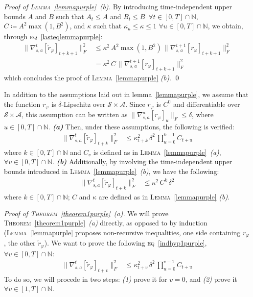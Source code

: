 \emph{Proof of \textsc{Lemma}~\ref{lemmapurple}~\emph{(b)}.}
By introducing time-independent upper bounds $A$ and $B$ such that
$A_t \leq A$ and $B_t \leq B$
$\, \forall t \in [0, T] \cap \mathbb{N}$,
$C \coloneqq A^2 \max(1, B^2)$,
and $\kappa$ such that $\kappa_u \leq \kappa \leq 1$ $\forall u \in [0, T] \cap \mathbb{N}$,
we obtain, through \textsc{eq}~\ref{lasteqlemmapurple}:
\begin{align}
\lVert \nabla_{s,a}^t[\tilde{r}_\varphi]_{t+k+1} \rVert ^2_F
&\leq
\kappa^2 \, A^2 \max(1, B^2) \, \lVert \nabla_{s,a}^{t+1}[r_\varphi]_{t+k+1} \rVert ^2_F \\
&=
\kappa^2 \, C \, \lVert \nabla_{s,a}^{t+1}[r_\varphi]_{t+k+1} \rVert ^2_F
\end{align}
which concludes the proof of \textsc{Lemma}~\ref{lemmapurple} \emph{(b)}. \qed

\begin{theorem}
\label{theorem1purple}
In addition to the assumptions laid out in lemma~\ref{lemmapurple},
we assume that the function $r_\varphi$ is $\delta$-Lipschitz
over $\mathcal{S} \times \mathcal{A}$.
Since $r_\varphi$ is $C^0$ and differentiable over $\mathcal{S} \times \mathcal{A}$,
this assumption can be written as
$\lVert \nabla_{s,a}^u[r_\varphi]_u \rVert _F \leq \delta$,
where $u \in [0, T] \cap \mathbb{N}$.
\textbf{\emph{(a)}} Then, under these assumptions, the following is verified:
\begin{align}
\lVert \nabla_{s,a}^t[\tilde{r}_\varphi]_{t+k} \rVert ^2_F
&\leq
\kappa_{t+k}^2 \, \delta ^2 \, \prod_{u=0}^{k-1} C_{t+u}
\end{align}
where $k \in [0, T] \cap \mathbb{N}$ and $C_v$ is defined as
in \textsc{Lemma}~\ref{lemmapurple}~\textit{(a)}, $\forall v \in [0, T] \cap \mathbb{N}$.
\textbf{\emph{(b)}} Additionally, by involving the time-independent upper bounds
introduced in \textsc{Lemma}~\ref{lemmapurple}~\textit{(b)}, we have the following:
\begin{align}
\lVert \nabla_{s,a}^t[\tilde{r}_\varphi]_{t+k} \rVert ^2_F
&\leq
\kappa^2 \, C^k \, \delta ^2
\end{align}
where $k \in [0, T] \cap \mathbb{N}$; $C$ and $\kappa$ are defined as
in \textsc{Lemma}~\ref{lemmapurple} \textit{(b)}.
\end{theorem}

\emph{Proof of \textsc{Theorem}~\ref{theorem1purple}~\emph{(a)}.}
We will prove \textsc{Theorem}~\ref{theorem1purple}~\emph{(a)} directly,
as opposed to by induction
(\textsc{Lemma}~\ref{lemmapurple} proposes non-recursive inequalities,
one side containing $r_\varphi$, the other $\tilde{r}_\varphi$).
We want to prove the following \textsc{eq}~\ref{indhyp1purple}, $\forall v \in [0, T] \cap \mathbb{N}$:
\begin{align}
\lVert \nabla_{s,a}^t[\tilde{r}_\varphi]_{t+v} \rVert ^2_F
&\leq
\kappa_{t+v}^2 \, \delta ^2 \, \prod_{u=0}^{v-1} C_{t+u}
\label{indhyp1purple}
\end{align}
To do so, we will procede in two steps: \textit{(1)} prove it for $v=0$, and
\textit{(2)} prove it $\forall v \in [1, T] \cap \mathbb{N}$.

